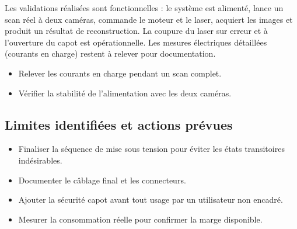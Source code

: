 Les validations réalisées sont fonctionnelles : le système est alimenté,
lance un scan réel à deux caméras, commande le moteur et le laser, acquiert
les images et produit un résultat de reconstruction. La coupure du laser sur
erreur et à l'ouverture du capot est opérationnelle. Les mesures électriques
détaillées (courants en charge) restent à relever pour documentation.

\begin{itemize}
  \item Relever les courants en charge pendant un scan complet.
  \item Vérifier la stabilité de l'alimentation avec les deux caméras.
\end{itemize}

\subsection{Limites identifiées et actions prévues}

\begin{itemize}
  \item Finaliser la séquence de mise sous tension pour éviter les états
        transitoires indésirables.
  \item Documenter le câblage final et les connecteurs.
  \item Ajouter la sécurité capot avant tout usage par un utilisateur non
        encadré.
  \item Mesurer la consommation réelle pour confirmer la marge disponible.
\end{itemize}
